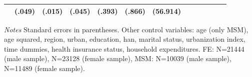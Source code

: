 \begin{table}[h]
\begin{adjustbox}{max width=\linewidth, center}
\begin{threeparttable}
{\begin{tabular}{l*{6}{S
S}}
                &   (.049)         &   (.015)         &   (.045)         &   (.393)         &   (.866)         & (56.914)         \\                
\bottomrule
\end{tabular}
\begin{tablenotes}
\item \textit{Notes}   Standard errors in parentheses.
Other control variables: age (only MSM), age squared, region, urban, education, han, marital status, urbanization index, time dummies, health insurance status, household expenditures. FE:  N=21444 (male sample), N=23128 (female sample), MSM: N=10039 (male sample), N=11489 (female sample).
\end{tablenotes}
}
\end{threeparttable}
\end{adjustbox}
\end{table}



